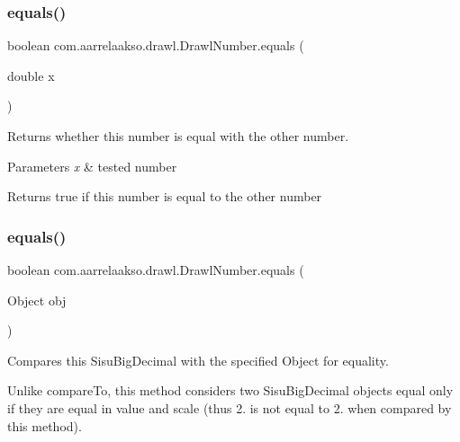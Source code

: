 \subsubsection{\texorpdfstring{equals()}{equals()}\hspace{0.1cm}{\footnotesize\ttfamily [2/3]}}
{\footnotesize\ttfamily boolean com.\+aarrelaakso.\+drawl.\+Drawl\+Number.\+equals (\begin{DoxyParamCaption}\item[{double}]{x }\end{DoxyParamCaption})\hspace{0.3cm}{\ttfamily [protected]}}



Returns whether this number is equal with the other number. 


\begin{DoxyParams}{Parameters}
{\em x} & tested number \\
\hline
\end{DoxyParams}
\begin{DoxyReturn}{Returns}
true if this number is equal to the other number 
\end{DoxyReturn}
\mbox{\label{classcom_1_1aarrelaakso_1_1drawl_1_1_drawl_number_a1599c6bdf131bc6b8a985f6a4b1b6f00}} 
\subsubsection{\texorpdfstring{equals()}{equals()}\hspace{0.1cm}{\footnotesize\ttfamily [3/3]}}
{\footnotesize\ttfamily boolean com.\+aarrelaakso.\+drawl.\+Drawl\+Number.\+equals (\begin{DoxyParamCaption}\item[{Object}]{obj }\end{DoxyParamCaption})}



Compares this Sisu\+Big\+Decimal with the specified Object for equality. 

Unlike compare\+To, this method considers two Sisu\+Big\+Decimal objects equal only if they are equal in value and scale (thus 2. is not equal to 2. when compared by this method).



